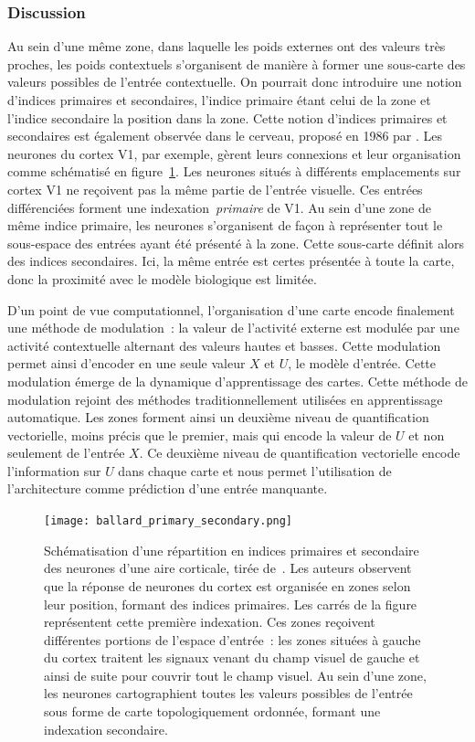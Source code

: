 \documentclass[../main]{subfiles}
\begin{document}
\subsubsection{Discussion}

Au sein d'une même zone, dans laquelle les poids externes ont des valeurs très proches, les poids contextuels s'organisent de manière à former une sous-carte des valeurs possibles de l'entrée contextuelle.
On pourrait donc introduire une notion d'indices primaires et secondaires, l'indice primaire étant celui de la zone et l'indice secondaire la position dans la zone.
Cette notion d'indices primaires et secondaires est également observée dans le cerveau, proposé en 1986 par \cite{ballard_cortical_1986}. Les neurones du cortex V1, par exemple, gèrent leurs connexions et leur organisation comme schématisé en figure~\ref{fig:ballard}.
Les neurones situés à différents emplacements sur cortex V1 ne reçoivent pas la même partie de l'entrée visuelle. Ces entrées différenciées forment une indexation~\emph{primaire} de V1. Au sein d'une zone de même indice primaire, les neurones s'organisent de façon à représenter tout le sous-espace des entrées ayant été présenté à la zone. Cette sous-carte définit alors des indices secondaires.
Ici, la même entrée est certes présentée à toute la carte, donc la proximité avec le modèle biologique est limitée.

D'un point de vue computationnel, l'organisation d'une carte encode finalement une méthode de modulation~: la valeur de l'activité externe est modulée par une activité contextuelle alternant des valeurs hautes et basses. Cette modulation permet ainsi d'encoder en une seule valeur $X$ et $U$, le modèle d'entrée. Cette modulation émerge de la dynamique d'apprentissage des cartes. Cette méthode de modulation rejoint des méthodes traditionnellement utilisées en apprentissage automatique.
Les zones forment ainsi un deuxième niveau de quantification vectorielle, moins précis que le premier, mais qui encode la valeur de $U$ et non seulement de l'entrée $X$. 
Ce deuxième niveau de quantification vectorielle encode l'information sur $U$ dans chaque carte et nous permet l'utilisation de l'architecture comme prédiction d'une entrée manquante.

\begin{figure}[h!]
	\centering\texttt{[image: ballard\_primary\_secondary.png]}
	\caption{Schématisation d'une répartition en indices primaires et secondaire des neurones d'une aire corticale, tirée de~\cite{ballard_cortical_1986}. 
	Les auteurs observent que la réponse de neurones du cortex est organisée en zones selon leur position, formant des indices primaires. Les carrés de la figure représentent cette première indexation.
	Ces zones reçoivent différentes portions de l'espace d'entrée~: les zones situées à gauche du cortex traitent les signaux venant du champ visuel de gauche et ainsi de suite pour couvrir tout le champ visuel.
	Au sein d'une zone, les neurones cartographient toutes les valeurs possibles de l'entrée sous forme de carte topologiquement ordonnée, formant une indexation secondaire. \label{fig:ballard}}
\end{figure}
\end{document}
